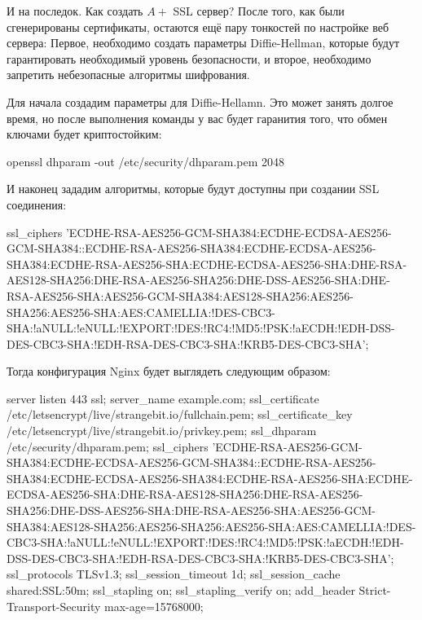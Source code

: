И на последок. Как создать $A+$ SSL сервер? После того, как были сгенерированы
сертификаты, остаются ещё пару тонкостей по настройке веб сервера: Первое, необходимо
создать параметры Diffie-Hellman, которые будут гарантировать необходимый уровень
безопасности, и второе, необходимо запретить небезопасные алгоритмы шифрования.

Для начала создадим параметры для Diffie-Hellamn. Это может занять долгое время, но
после выполнения команды у вас будет гаранития того, что обмен ключами будет 
криптостойким:

\begin{python}
openssl dhparam -out /etc/security/dhparam.pem 2048
\end{python}

И наконец зададим алгоритмы, которые будут доступны при создании SSL соединения:

\begin{python}
    ssl_ciphers 'ECDHE-RSA-AES256-GCM-SHA384:ECDHE-ECDSA-AES256-GCM-SHA384::ECDHE-RSA-AES256-SHA384:ECDHE-ECDSA-AES256-SHA384:ECDHE-RSA-AES256-SHA:ECDHE-ECDSA-AES256-SHA:DHE-RSA-AES128-SHA256:DHE-RSA-AES256-SHA256:DHE-DSS-AES256-SHA:DHE-RSA-AES256-SHA:AES256-GCM-SHA384:AES128-SHA256:AES256-SHA256:AES256-SHA:AES:CAMELLIA:!DES-CBC3-SHA:!aNULL:!eNULL:!EXPORT:!DES:!RC4:!MD5:!PSK:!aECDH:!EDH-DSS-DES-CBC3-SHA:!EDH-RSA-DES-CBC3-SHA:!KRB5-DES-CBC3-SHA';
\end{python}

Тогда конфигурация Nginx будет выглядеть следующим образом:

\begin{python}
server {
    listen 443 ssl;
    server_name example.com;
    ssl_certificate /etc/letsencrypt/live/strangebit.io/fullchain.pem;
    ssl_certificate_key /etc/letsencrypt/live/strangebit.io/privkey.pem;
    ssl_dhparam /etc/security/dhparam.pem;
    ssl_ciphers 'ECDHE-RSA-AES256-GCM-SHA384:ECDHE-ECDSA-AES256-GCM-SHA384::ECDHE-RSA-AES256-SHA384:ECDHE-ECDSA-AES256-SHA384:ECDHE-RSA-AES256-SHA:ECDHE-ECDSA-AES256-SHA:DHE-RSA-AES128-SHA256:DHE-RSA-AES256-SHA256:DHE-DSS-AES256-SHA:DHE-RSA-AES256-SHA:AES256-GCM-SHA384:AES128-SHA256:AES256-SHA256:AES256-SHA:AES:CAMELLIA:!DES-CBC3-SHA:!aNULL:!eNULL:!EXPORT:!DES:!RC4:!MD5:!PSK:!aECDH:!EDH-DSS-DES-CBC3-SHA:!EDH-RSA-DES-CBC3-SHA:!KRB5-DES-CBC3-SHA';
    ssl_protocols TLSv1.3;
    ssl_session_timeout 1d;
    ssl_session_cache shared:SSL:50m;
    ssl_stapling on;
    ssl_stapling_verify on;
    add_header Strict-Transport-Security max-age=15768000;
}
\end{python}

